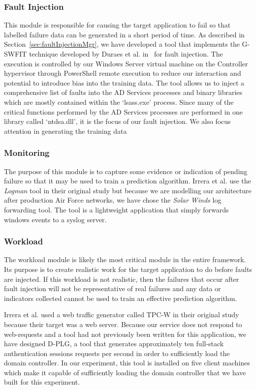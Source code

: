 \subsubsection{Fault Injection} \label{sec:faultInjectionTool} 
This module is responsible for causing the target application to fail so that
labelled failure data can be generated in a short period of time.  As described
in Section~\ref{sec:faultInjectionMgr}, we have developed a tool that
implements the G-SWFIT technique developed by Duraes et al.  in~\cite{gswfit}
for fault injection.  The execution is controlled by our Windows Server virtual
machine on the Controller hypervisor through PowerShell remote execution to
reduce our interaction and potential to introduce bias into the training data.
The tool allows us to inject a comprehensive list of faults into the AD
Services processes and binary libraries which are mostly contained within the
`lsass.exe' process.  Since many of the critical functions performed by the AD
Services processes are performed in one library called `ntdsa.dll', it is the
focus of our fault injection.  We also focus attention in generating the
training data 

\subsubsection{Monitoring} \label{sec:sandboxMonitoringTool} 
The purpose of this module is to capture some evidence or indication of pending
failure so that it may be used to train a prediction algorithm.  Irrera et al.
use the \emph{Logman} tool in their original study but because we are modelling
our architecture after production Air Force networks, we have chose the
\emph{Solar Winds} log forwarding tool.  The tool is a lightweight application
that simply forwards windows events to a syslog server.

\subsubsection{Workload}  \label{sec:sandboxWorkload} 
The workload module is likely the most critical module in the entire framework.
Its purpose is to create realistic work for the target application to do before
faults are injected.  If this workload is not realistic, then the failures that
occur after fault injection will not be representative of real failures and any
data or indicators collected cannot be used to train an effective prediction
algorithm.

Irrera et al. used a web traffic generator called TPC-W in their original study
because their target was a web server.  Because our service does not respond to
web-requests and a tool had not previously been written for this application,
we have designed D-PLG, a tool that generates approximately ten full-stack
authentication sessions requests per second in order to sufficiently load the
domain controller.  In our experiment, this tool is installed on five client
machines which make it capable of sufficiently loading the domain controller
that we have built for this experiment.

